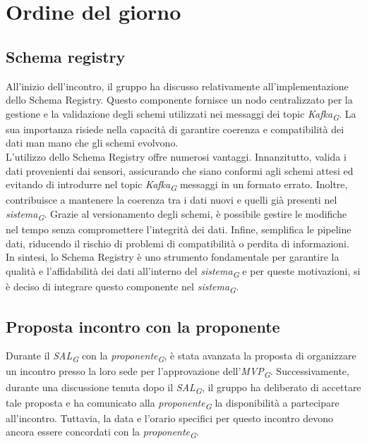 \documentclass{article}
\begin{document}
\section{Ordine del giorno}
\subsection{Schema registry}
All’inizio dell’incontro, il gruppo ha discusso relativamente all’implementazione dello Schema Registry. Questo componente fornisce un nodo centralizzato per la gestione e la validazione degli schemi utilizzati nei messaggi dei topic \textit{Kafka}\textsubscript{\textit{G}}. La sua importanza risiede nella capacità di garantire coerenza e compatibilità dei dati man mano che gli schemi evolvono. \\
L’utilizzo dello Schema Registry offre numerosi vantaggi. Innanzitutto, valida i dati provenienti dai sensori, assicurando che siano conformi agli schemi attesi ed evitando di introdurre nel topic \textit{Kafka}\textsubscript{\textit{G}} messaggi in un formato errato. Inoltre, contribuisce a mantenere la coerenza tra i dati nuovi e quelli già presenti nel \textit{sistema}\textsubscript{\textit{G}}. Grazie al versionamento degli schemi, è possibile gestire le modifiche nel tempo senza compromettere l’integrità dei dati. Infine, semplifica le pipeline dati, riducendo il rischio di problemi di compatibilità o perdita di informazioni.
In sintesi, lo Schema Registry è uno strumento fondamentale per garantire la qualità e l’affidabilità dei dati all’interno del \textit{sistema}\textsubscript{\textit{G}} e per queste motivazioni, si è deciso di integrare questo componente nel \textit{sistema}\textsubscript{\textit{G}}.

\subsection{Proposta incontro con la proponente}
Durante il \textit{SAL}\textsubscript{\textit{G}} con la \textit{proponente}\textsubscript{\textit{G}}, è stata avanzata la proposta di organizzare un incontro presso la loro sede per l’approvazione dell’\textit{MVP}\textsubscript{\textit{G}}. Successivamente, durante una discussione tenuta dopo il \textit{SAL}\textsubscript{\textit{G}}, il gruppo ha deliberato di accettare tale proposta e ha comunicato alla \textit{proponente}\textsubscript{\textit{G}} la disponibilità a partecipare all’incontro. Tuttavia, la data e l’orario specifici per questo incontro devono ancora essere concordati con la \textit{proponente}\textsubscript{\textit{G}}. 
\end{document}
